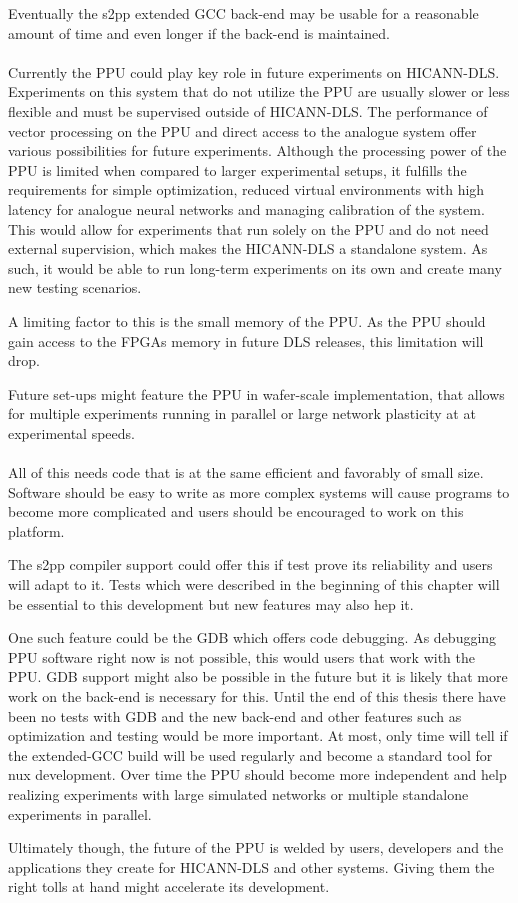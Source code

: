 Eventually the s2pp extended GCC back-end may be usable for a reasonable amount of time and even longer if the back-end is maintained.
\\
\\
Currently the \ac{PPU} could play key role in future experiments on \ac{HICANN-DLS}.
Experiments on this system that do not utilize the \ac{PPU} are usually slower or less flexible and must be supervised outside of \ac{HICANN-DLS}.
The performance of vector processing on the \ac{PPU} and direct access to the analogue system offer various possibilities for future experiments.
Although the processing power of the \ac{PPU} is limited when compared to larger experimental setups, it fulfills the requirements for simple optimization, reduced virtual environments with high latency for analogue neural networks and managing calibration of the system.
This would allow for experiments that run solely on the \ac{PPU} and do not need external supervision, which makes the \ac{HICANN-DLS} a standalone system.
As such, it would be able to run long-term experiments on its own and create many new testing scenarios.

A limiting factor to this is the small memory of the \ac{PPU}.
As the \ac{PPU} should gain access to the FPGAs memory in future DLS releases, this limitation will drop.

Future set-ups might feature the \ac{PPU} in wafer-scale implementation, that allows for multiple experiments running in parallel or large network plasticity at at experimental speeds.
\\
\\
All of this needs code that is at the same efficient and favorably of small size.
Software should be easy to write as more complex systems will cause programs to become more complicated and users should be encouraged to work on this platform.

The s2pp compiler support could offer this if test prove its reliability and users will adapt to it.
Tests which were described in the beginning of this chapter will be essential to this development but new features may also hep it.

One such feature could be the \ac{GDB} which offers code debugging.
As debugging \ac{PPU} software right now is not possible, this would users that work with the \ac{PPU}.
\ac{GDB} support might also be possible in the future but it is likely that more work on the back-end is necessary for this.
Until the end of this thesis there have been no tests with \ac{GDB} and the new back-end and other features such as optimization and testing would be more important.
At most, only time will tell if the extended-GCC build will be used regularly and become a standard tool for nux development.
Over time the \ac{PPU} should become more independent and help realizing experiments with large simulated networks or multiple standalone experiments in parallel.

Ultimately though, the future of the \ac{PPU} is welded by users, developers and the applications they create for \ac{HICANN-DLS} and other systems. Giving them the right tolls at hand might accelerate its development.
